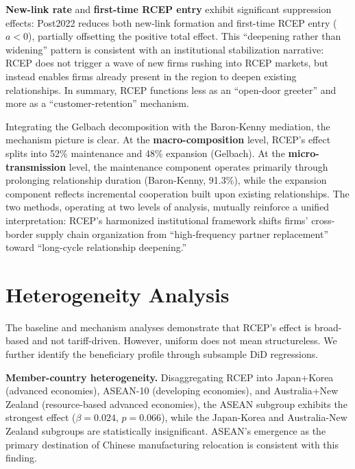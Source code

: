 \documentclass[preprint,12pt,authoryear]{elsarticle}
\begin{document}
\textbf{New-link rate} and \textbf{first-time RCEP entry} exhibit significant suppression effects: Post2022 reduces both new-link formation and first-time RCEP entry ($a<0$), partially offsetting the positive total effect. This ``deepening rather than widening'' pattern is consistent with an institutional stabilization narrative: RCEP does not trigger a wave of new firms rushing into RCEP markets, but instead enables firms already present in the region to deepen existing relationships. In summary, RCEP functions less as an ``open-door greeter'' and more as a ``customer-retention'' mechanism.

Integrating the Gelbach decomposition with the Baron-Kenny mediation, the mechanism picture is clear. At the \textbf{macro-composition} level, RCEP's effect splits into 52\% maintenance and 48\% expansion (Gelbach). At the \textbf{micro-transmission} level, the maintenance component operates primarily through prolonging relationship duration (Baron-Kenny, 91.3\%), while the expansion component reflects incremental cooperation built upon existing relationships. The two methods, operating at two levels of analysis, mutually reinforce a unified interpretation: RCEP's harmonized institutional framework shifts firms' cross-border supply chain organization from ``high-frequency partner replacement'' toward ``long-cycle relationship deepening.''

\section{Heterogeneity Analysis}
\label{sec:heterogeneity}

The baseline and mechanism analyses demonstrate that RCEP's effect is broad-based and not tariff-driven. However, uniform does not mean structureless. We further identify the beneficiary profile through subsample DiD regressions.



\textbf{Member-country heterogeneity.} Disaggregating RCEP into Japan+Korea (advanced economies), ASEAN-10 (developing economies), and Australia+New Zealand (resource-based advanced economies), the ASEAN subgroup exhibits the strongest effect ($\beta=0.024$, $p=0.066$), while the Japan-Korea and Australia-New Zealand subgroups are statistically insignificant. ASEAN's emergence as the primary destination of Chinese manufacturing relocation is consistent with this finding.
\end{document}
